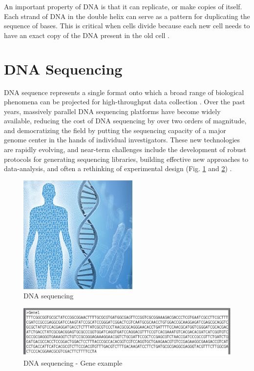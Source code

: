 \documentclass[12pt,openany]{llncs}
\begin{document}
An important property of DNA is that it can replicate, or make copies of itself. Each strand of DNA in the double helix can serve as a pattern for duplicating the sequence of bases. This is critical when cells divide because each new cell needs to have an exact copy of the DNA present in the old cell \cite{DNA3}.

\section{DNA Sequencing}
DNA sequence represents a single format onto which a broad range of biological phenomena can be projected for high-throughput data collection \cite{seq1}. 
Over the past years, massively parallel DNA sequencing platforms have become widely available, reducing the cost of DNA sequencing by over two orders of magnitude, and democratizing the field by putting the sequencing capacity of a major genome center in the hands of individual investigators. These new technologies are rapidly evolving, and near-term challenges include the development of robust protocols for generating sequencing libraries, building effective new approaches to data-analysis, and often a rethinking of experimental design (Fig. \ref{fig:fig-NGS-1} and \ref{fig:fig-NGS-2}) \cite{seq2,seq3}.
\begin{figure}
	\centering
	\includegraphics{./figs/NGS-1}
	\caption{\label{fig:fig-NGS-1}DNA sequencing}
\end{figure}

\begin{figure}
	\centering
	\includegraphics[width=.911\linewidth]{./figs/NGS-2}
	\caption{\label{fig:fig-NGS-2}DNA sequencing - Gene example}
\end{figure}
\end{document}
